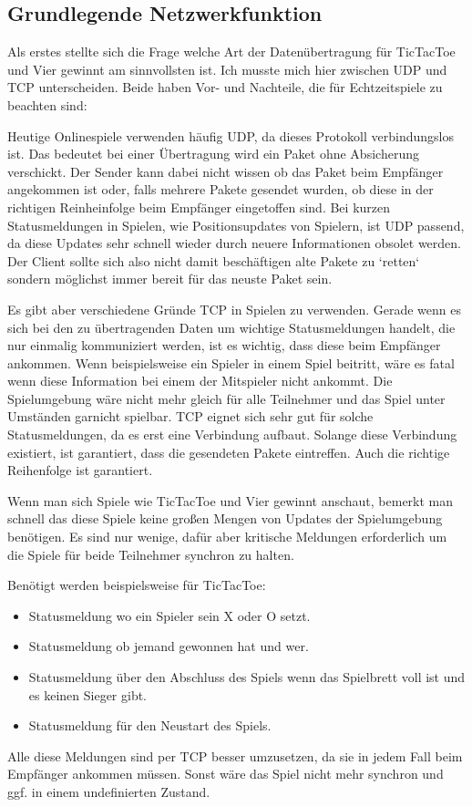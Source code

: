 \subsection{Grundlegende Netzwerkfunktion}
Als erstes stellte sich die Frage welche Art der Datenübertragung für TicTacToe und Vier gewinnt am sinnvollsten ist.
Ich musste mich hier zwischen UDP und TCP unterscheiden. Beide haben Vor- und Nachteile, die für Echtzeitspiele zu beachten sind:
\par
Heutige Onlinespiele verwenden häufig UDP, da dieses Protokoll verbindungslos ist.
Das bedeutet bei einer Übertragung wird ein Paket ohne Absicherung verschickt. Der Sender kann dabei nicht wissen ob das Paket
beim Empfänger angekommen ist oder, falls mehrere Pakete gesendet wurden, ob diese in der richtigen Reinheinfolge beim Empfänger
eingetoffen sind.
Bei kurzen Statusmeldungen in Spielen, wie Positionsupdates von Spielern, ist UDP passend, da diese Updates sehr schnell wieder
durch neuere Informationen obsolet werden. Der Client sollte sich also nicht damit beschäftigen alte Pakete zu `retten` sondern
möglichst immer bereit für das neuste Paket sein.
\par
Es gibt aber verschiedene Gründe TCP in Spielen zu verwenden.
Gerade wenn es sich bei den zu übertragenden Daten um wichtige Statusmeldungen handelt, die nur einmalig kommuniziert werden,
ist es wichtig, dass diese beim Empfänger ankommen. Wenn beispielsweise ein Spieler in einem Spiel beitritt, wäre es fatal
wenn diese Information bei einem der Mitspieler nicht ankommt. Die Spielumgebung wäre nicht mehr gleich für alle Teilnehmer
und das Spiel unter Umständen garnicht spielbar. TCP eignet sich sehr gut für solche Statusmeldungen, da es erst eine Verbindung aufbaut.
Solange diese Verbindung existiert, ist garantiert, dass die gesendeten Pakete eintreffen. Auch die richtige Reihenfolge ist garantiert.
\par
Wenn man sich Spiele wie TicTacToe und Vier gewinnt anschaut, bemerkt man schnell das diese Spiele keine großen Mengen von Updates
der Spielumgebung benötigen. Es sind nur wenige, dafür aber kritische Meldungen erforderlich um die Spiele für beide Teilnehmer
synchron zu halten.
\par
Benötigt werden beispielsweise für TicTacToe:
\begin{itemize}
    \item Statusmeldung wo ein Spieler sein X oder O setzt.
    \item Statusmeldung ob jemand gewonnen hat und wer.
    \item Statusmeldung über den Abschluss des Spiels wenn das Spielbrett voll ist und es keinen Sieger gibt.
    \item Statusmeldung für den Neustart des Spiels.
\end{itemize}
Alle diese Meldungen sind per TCP besser umzusetzen, da sie in jedem Fall beim Empfänger ankommen müssen. Sonst wäre das Spiel
nicht mehr synchron und ggf. in einem undefinierten Zustand.
